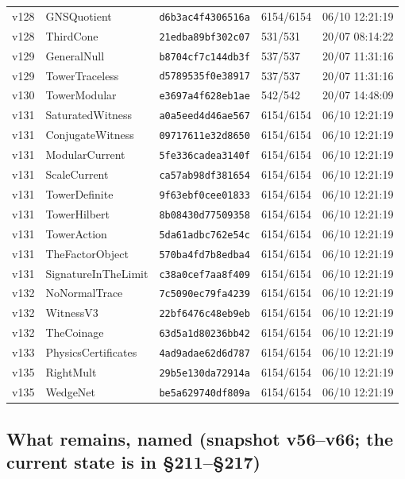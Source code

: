 \documentclass[11pt]{article}
\theoremstyle{definition}\newtheorem{deriv}{Derivation}
\begin{document}
{\begin{longtable}{@{}lllll@{}}
v128 & GNSQuotient & \texttt{d6b3ac4f4306516a} & 6154/6154 & 06/10 12:21:19 \\
v128 & ThirdCone & \texttt{21edba89bf302c07} & 531/531 & 20/07 08:14:22 \\
v129 & GeneralNull & \texttt{b8704cf7c144db3f} & 537/537 & 20/07 11:31:16 \\
v129 & TowerTraceless & \texttt{d5789535f0e38917} & 537/537 & 20/07 11:31:16 \\
v130 & TowerModular & \texttt{e3697a4f628eb1ae} & 542/542 & 20/07 14:48:09 \\
v131 & SaturatedWitness & \texttt{a0a5eed4d46ae567} & 6154/6154 & 06/10 12:21:19 \\
v131 & ConjugateWitness & \texttt{09717611e32d8650} & 6154/6154 & 06/10 12:21:19 \\
v131 & ModularCurrent & \texttt{5fe336cadea3140f} & 6154/6154 & 06/10 12:21:19 \\
v131 & ScaleCurrent & \texttt{ca57ab98df381654} & 6154/6154 & 06/10 12:21:19 \\
v131 & TowerDefinite & \texttt{9f63ebf0cee01833} & 6154/6154 & 06/10 12:21:19 \\
v131 & TowerHilbert & \texttt{8b08430d77509358} & 6154/6154 & 06/10 12:21:19 \\
v131 & TowerAction & \texttt{5da61adbc762e54c} & 6154/6154 & 06/10 12:21:19 \\
v131 & TheFactorObject & \texttt{570ba4fd7b8edba4} & 6154/6154 & 06/10 12:21:19 \\
v131 & SignatureInTheLimit & \texttt{c38a0cef7aa8f409} & 6154/6154 & 06/10 12:21:19 \\
v132 & NoNormalTrace & \texttt{7c5090ec79fa4239} & 6154/6154 & 06/10 12:21:19 \\
v132 & WitnessV3 & \texttt{22bf6476c48eb9eb} & 6154/6154 & 06/10 12:21:19 \\
v132 & TheCoinage & \texttt{63d5a1d80236bb42} & 6154/6154 & 06/10 12:21:19 \\
v133 & PhysicsCertificates & \texttt{4ad9adae62d6d787} & 6154/6154 & 06/10 12:21:19 \\
v135 & RightMult & \texttt{29b5e130da72914a} & 6154/6154 & 06/10 12:21:19 \\
v135 & WedgeNet & \texttt{be5a629740df809a} & 6154/6154 & 06/10 12:21:19 \\
\bottomrule\end{longtable}}

\subsection*{What remains, named (snapshot v56--v66; the current state is in \S211--\S217)}
\end{document}

